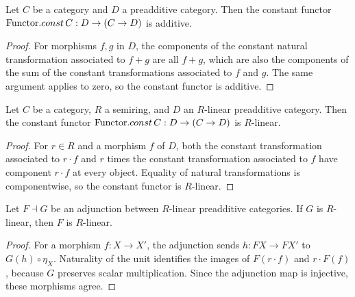 \begin{lemma}\leanok
  \label{lem:Functor_const_additive}
  Let \(C\) be a category and \(D\) a preadditive category. Then the constant functor
  \(\mathrm{Functor}.const\, C : D \to (C \to D)\) is additive.
\end{lemma}

\begin{proof}

\leanok
  For morphisms \(f,g\) in \(D\), the components of the constant natural transformation associated to \(f+g\) are all \(f+g\), which are also the components of the sum of the constant transformations associated to \(f\) and \(g\). The same argument applies to zero, so the constant functor is additive.
\end{proof}

\begin{lemma}\leanok
  \label{lem:Functor_const_linear}
  Let \(C\) be a category, \(R\) a semiring, and \(D\) an \(R\)-linear preadditive category.
  Then the constant functor \(\mathrm{Functor}.const\, C : D \to (C \to D)\) is \(R\)-linear.
\end{lemma}

\begin{proof}

\leanok
  For \(r\in R\) and a morphism \(f\) of \(D\), both the constant transformation associated to \(r\cdot f\) and \(r\) times the constant transformation associated to \(f\) have component \(r\cdot f\) at every object. Equality of natural transformations is componentwise, so the constant functor is \(R\)-linear.
\end{proof}

\begin{lemma}\leanok
  \label{lemma:Adjunction_left_adjoint_linear}
  Let \(F \dashv G\) be an adjunction between \(R\)-linear preadditive categories. If \(G\) is \(R\)-linear, then \(F\) is \(R\)-linear.
\end{lemma}

\begin{proof}
  \leanok
  For a morphism \(f:X\to X'\), the adjunction sends \(h:FX\to FX'\) to \(G(h)\circ\eta_X\). Naturality of the unit identifies the images of \(F(r\cdot f)\) and \(r\cdot F(f)\), because \(G\) preserves scalar multiplication. Since the adjunction map is injective, these morphisms agree.
\end{proof}

